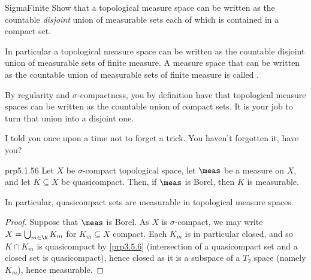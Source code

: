 \begin{exr}{}{SigmaFinite}
Show that a topological measure space can be written as the countable \emph{disjoint} union of measurable sets each of which is contained in a compact set.
\begin{rmk}
In particular a topological measure space can be written as the countable disjoint union of measurable sets of finite measure.  A measure space that can be written as the countable union of measurable sets of finite measure is called .
\end{rmk}
\begin{rmk}
By regularity and $\sigma$-compactness, you by definition have that topological measure spaces can be written as the countable union of compact sets.  It is your job to turn that union into a disjoint one.
\end{rmk}
\begin{rmk}
I told you once upon a time not to forget a trick.  You haven't forgotten it, have you?
\end{rmk}
\end{exr}
\begin{prp}{}{prp5.1.56}
Let $X$ be $\sigma$-compact topological space, let $\meas$ be a measure on $X$, and let $K\subseteq X$ be quasicompact.  Then, if $\meas$ is Borel, then $K$ is measurable.
\begin{rmk}
In particular, quasicompact sets are measurable in topological measure spaces.
\end{rmk}
\begin{proof}
Suppose that $\meas$ is Borel.  As $X$ is $\sigma$-compact, we may write $X=\bigcup _{m\in \N}K_m$ for $K_m\subseteq X$ compact.  Each $K_m$ is in particular closed, and so $K\cap K_m$ is quasicompact by \cref{prp3.5.6} (intersection of a quasicompact set and a closed set is quasicompact), hence closed as it is a subspace of a $T_2$ space (namely $K_m$), hence measurable.
\end{proof}
\end{prp}

